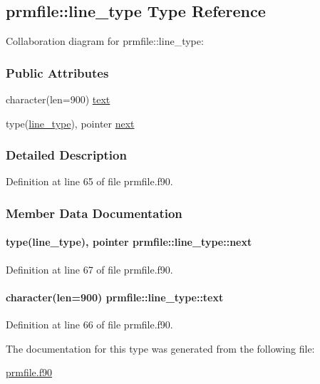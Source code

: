 \hypertarget{structprmfile_1_1line__type}{\subsection{prmfile\-:\-:line\-\_\-type Type Reference}
\label{structprmfile_1_1line__type}
}


Collaboration diagram for prmfile\-:\-:line\-\_\-type\-:
\subsubsection*{Public Attributes}
\begin{DoxyCompactItemize}
\item 
character(len=900) \hyperlink{structprmfile_1_1line__type_aaaa766072168cc327df88a4eee306c0a}{text}
\item 
type(\hyperlink{structprmfile_1_1line__type}{line\-\_\-type}), pointer \hyperlink{structprmfile_1_1line__type_ae99b897f65d9833825800fb3130a9ffb}{next}
\end{DoxyCompactItemize}


\subsubsection{Detailed Description}


Definition at line 65 of file prmfile.\-f90.



\subsubsection{Member Data Documentation}
\hypertarget{structprmfile_1_1line__type_ae99b897f65d9833825800fb3130a9ffb}{
\paragraph[{next}]{\setlength{\rightskip}{0pt plus 5cm}type({\bf line\-\_\-type}), pointer prmfile\-::line\-\_\-type\-::next}}\label{structprmfile_1_1line__type_ae99b897f65d9833825800fb3130a9ffb}


Definition at line 67 of file prmfile.\-f90.

\hypertarget{structprmfile_1_1line__type_aaaa766072168cc327df88a4eee306c0a}{
\paragraph[{text}]{\setlength{\rightskip}{0pt plus 5cm}character(len=900) prmfile\-::line\-\_\-type\-::text}}\label{structprmfile_1_1line__type_aaaa766072168cc327df88a4eee306c0a}


Definition at line 66 of file prmfile.\-f90.



The documentation for this type was generated from the following file\-:\begin{DoxyCompactItemize}
\item 
\hyperlink{prmfile_8f90}{prmfile.\-f90}\end{DoxyCompactItemize}

